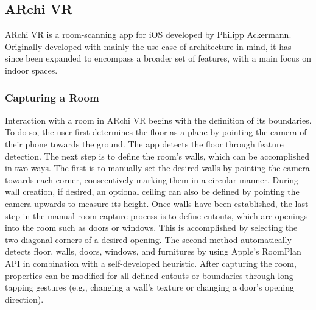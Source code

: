 \documentclass{article}
\begin{document}
\subsection{ARchi VR}
ARchi VR is a room-scanning app for iOS developed by Philipp Ackermann. Originally developed with mainly the use-case of architecture in mind, it has since been expanded to encompass a broader set of features, with a main focus on indoor spaces.\\
\subsubsection{Capturing a Room}
Interaction with a room in ARchi VR begins with the definition of its boundaries. To do so, the user first determines the floor as a plane by pointing the camera of their phone towards the ground. The app detects the floor through feature detection. The next step is to define the room's walls, which can be accomplished in two ways. The first is to manually set the desired walls by pointing the camera towards each corner, consecutively marking them in a circular manner. During wall creation, if desired, an optional ceiling can also be defined by pointing the camera upwards to measure its height. Once walls have been established, the last step in the manual room capture process is to define cutouts, which are openings into the room such as doors or windows. This is accomplished by selecting the two diagonal corners of a desired opening.
The second method automatically detects floor, walls, doors, windows, and furnitures by using Apple's RoomPlan API\cite{inc_roomplan_2023} in combination with a self-developed heuristic.
After capturing the room, properties can be modified for all defined cutouts or boundaries through long-tapping gestures (e.g., changing a wall's texture or changing a door's opening direction).
\end{document}
